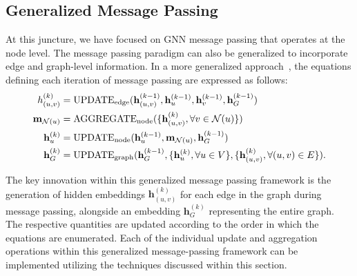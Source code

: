 \subsection{Generalized Message Passing}
At this juncture, we have focused on GNN message passing that operates at the node level. The message passing paradigm can also be generalized to incorporate edge and graph-level information. In a more generalized approach~\cite{battaglia2018relationalInductiveBiases}, the equations defining each iteration of message passing are expressed as follows:
\begin{align*}
\label\mathbf{h}^{(k)}_{(u,v)} &= \text{UPDATE}_\text{edge}(\mathbf{h}^{(k-1)}_{(u,v)}, \mathbf{h}^{(k-1)}_u, \mathbf{h}^{(k-1)}_v, \mathbf{h}^{(k-1)}_G)\\
\mathbf{m}_{\mathcal{N}(u)} &= \text{AGGREGATE}_\text{node}(\{\mathbf{h}^{(k)}_{(u,v)}, \forall v \in \mathcal{N}(u)\})\\
\mathbf{h}^{(k)}_u &= \text{UPDATE}_\text{node}(\mathbf{h}^{(k-1)}_u, \mathbf{m}_{\mathcal{N}(u)}, \mathbf{h}^{(k-1)}_G)\\
\mathbf{h}^{(k)}_G &= \text{UPDATE}_\text{graph}(\mathbf{h}^{(k-1)}_G, \{\mathbf{h}^{(k)}_u, \forall u \in V\}, \{\mathbf{h}^{(k)}_{(u,v)}, \forall (u,v) \in E\}).
\end{align*}

The key innovation within this generalized message passing framework is the generation of hidden embeddings $ \mathbf{h}^{(k)}_{(u,v)} $ for each edge in the graph during message passing, alongside an embedding $ \mathbf{h}^{(k)}_G $ representing the entire graph. The respective quantities are updated according to the order in which the equations are enumerated. Each of the individual update and aggregation operations within this generalized message-passing framework can be implemented utilizing the techniques discussed within this section.